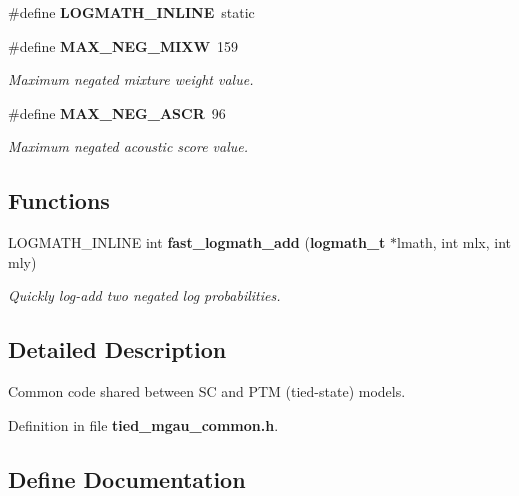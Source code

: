 \begin{DoxyCompactItemize}
\item 
\#define {\bfseries \-L\-O\-G\-M\-A\-T\-H\-\_\-\-I\-N\-L\-I\-N\-E}~static\label{tied__mgau__common_8h_a8be78151b3b0ce922541c2755b14ebf1}

\item 
\#define {\bf \-M\-A\-X\-\_\-\-N\-E\-G\-\_\-\-M\-I\-X\-W}~159
\begin{DoxyCompactList}\small\item\em \-Maximum negated mixture weight value. \end{DoxyCompactList}\item 
\#define {\bf \-M\-A\-X\-\_\-\-N\-E\-G\-\_\-\-A\-S\-C\-R}~96
\begin{DoxyCompactList}\small\item\em \-Maximum negated acoustic score value. \end{DoxyCompactList}\end{DoxyCompactItemize}
\subsection*{\-Functions}
\begin{DoxyCompactItemize}
\item 
\-L\-O\-G\-M\-A\-T\-H\-\_\-\-I\-N\-L\-I\-N\-E int {\bf fast\-\_\-logmath\-\_\-add} ({\bf logmath\-\_\-t} $\ast$lmath, int mlx, int mly)
\begin{DoxyCompactList}\small\item\em \-Quickly log-\/add two negated log probabilities. \end{DoxyCompactList}\end{DoxyCompactItemize}


\subsection{\-Detailed \-Description}
\-Common code shared between \-S\-C and \-P\-T\-M (tied-\/state) models. 

\-Definition in file {\bf tied\-\_\-mgau\-\_\-common.\-h}.



\subsection{\-Define \-Documentation}
